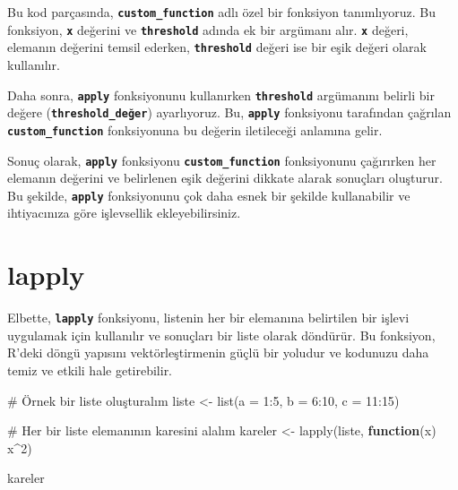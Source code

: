 \documentclass[
  letterpaper,
  DIV=11,
  numbers=noendperiod]{scrreprt}
\newenvironment{Shaded}{\begin{snugshade}}{\end{snugshade}}
\newcommand{\AttributeTok}[1]{\textcolor[rgb]{0.40,0.45,0.13}{#1}}
\newcommand{\CommentTok}[1]{\textcolor[rgb]{0.37,0.37,0.37}{#1}}
\newcommand{\ControlFlowTok}[1]{\textcolor[rgb]{0.00,0.23,0.31}{\textbf{#1}}}
\newcommand{\DecValTok}[1]{\textcolor[rgb]{0.68,0.00,0.00}{#1}}
\newcommand{\FunctionTok}[1]{\textcolor[rgb]{0.28,0.35,0.67}{#1}}
\newcommand{\NormalTok}[1]{\textcolor[rgb]{0.00,0.23,0.31}{#1}}
\newcommand{\OtherTok}[1]{\textcolor[rgb]{0.00,0.23,0.31}{#1}}
\newcommand{\SpecialCharTok}[1]{\textcolor[rgb]{0.37,0.37,0.37}{#1}}
\begin{document}
Bu kod parçasında, \textbf{\texttt{custom\_function}} adlı özel bir
fonksiyon tanımlıyoruz. Bu fonksiyon, \textbf{\texttt{x}} değerini ve
\textbf{\texttt{threshold}} adında ek bir argümanı alır.
\textbf{\texttt{x}} değeri, elemanın değerini temsil ederken,
\textbf{\texttt{threshold}} değeri ise bir eşik değeri olarak
kullanılır.

Daha sonra, \textbf{\texttt{apply}} fonksiyonunu kullanırken
\textbf{\texttt{threshold}} argümanını belirli bir değere
(\textbf{\texttt{threshold\_değer}}) ayarlıyoruz. Bu,
\textbf{\texttt{apply}} fonksiyonu tarafından çağrılan
\textbf{\texttt{custom\_function}} fonksiyonuna bu değerin iletileceği
anlamına gelir.

Sonuç olarak, \textbf{\texttt{apply}} fonksiyonu
\textbf{\texttt{custom\_function}} fonksiyonunu çağırırken her elemanın
değerini ve belirlenen eşik değerini dikkate alarak sonuçları oluşturur.
Bu şekilde, \textbf{\texttt{apply}} fonksiyonunu çok daha esnek bir
şekilde kullanabilir ve ihtiyacınıza göre işlevsellik ekleyebilirsiniz.

\section{lapply}\label{lapply}

Elbette, \textbf{\texttt{lapply}} fonksiyonu, listenin her bir elemanına
belirtilen bir işlevi uygulamak için kullanılır ve sonuçları bir liste
olarak döndürür. Bu fonksiyon, R'deki döngü yapısını vektörleştirmenin
güçlü bir yoludur ve kodunuzu daha temiz ve etkili hale getirebilir.

\begin{Shaded}
\begin{Highlighting}[]
\CommentTok{\# Örnek bir liste oluşturalım}
\NormalTok{liste }\OtherTok{\textless{}{-}} \FunctionTok{list}\NormalTok{(}\AttributeTok{a =} \DecValTok{1}\SpecialCharTok{:}\DecValTok{5}\NormalTok{, }\AttributeTok{b =} \DecValTok{6}\SpecialCharTok{:}\DecValTok{10}\NormalTok{, }\AttributeTok{c =} \DecValTok{11}\SpecialCharTok{:}\DecValTok{15}\NormalTok{)}

\CommentTok{\# Her bir liste elemanının karesini alalım}
\NormalTok{kareler }\OtherTok{\textless{}{-}} \FunctionTok{lapply}\NormalTok{(liste, }\ControlFlowTok{function}\NormalTok{(x) x}\SpecialCharTok{\^{}}\DecValTok{2}\NormalTok{)}

\NormalTok{kareler}
\end{Highlighting}
\end{Shaded}
\end{document}
